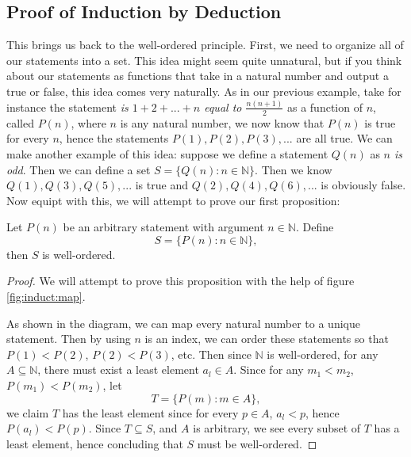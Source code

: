 \documentclass[11pt]{article}
\numberwithin{lemma}{section}
\numberwithin{equation}{section}
\numberwithin{define}{section}
\numberwithin{prop}{section}
\numberwithin{figure}{section}
\numberwithin{theorem}{section}
\newcounter{ex}[section]
\numberwithin{ex}{section}
\def\nat{\mathbb{N}}
\begin{document}
\subsection{Proof of Induction by Deduction}
This brings us back to the well-ordered principle. First, we need to organize all of our statements into a set. This idea might seem quite unnatural, but if you think about our statements as functions that take in a natural number and output a true or false, this idea comes very naturally. 
As in our previous example, take for instance the statement \textit{is $1+2+...+n$ equal to $\frac{n(n+1)}{2}$} as a function of $n$, called $P(n)$, where $n$ is any natural number, we now know that $P(n)$ is true for every $n$, hence the statements $P(1),P(2),P(3),...$ are all true. 
We can make another example of this idea: suppose we define a statement $Q(n)$ as \textit{$n$ is odd}. Then we can define a set $S=\{Q(n):n\in\nat\}$. Then we know $Q(1),Q(3),Q(5),...$ is true and $Q(2),Q(4),Q(6),...$ is obviously false. Now equipt with this, we will attempt to prove our first proposition:
\begin{prop}
\label{prop:well-order}
	Let $P(n)$ be an arbitrary statement with argument $n\in\nat$. Define
	$$S=\{P(n):n\in\nat\},$$
	then $S$ is well-ordered.
\end{prop}
\begin{proof}
	We will attempt to prove this proposition with the help of figure \eqref{fig:induct:map}.
	\begin{figure}[h]
	\centering
		\caption{}
		\label{fig:induct:map}
	\end{figure}
	As shown in the diagram, we can map every natural number to a unique statement. Then by using $n$ is an index, we can order these statements so that $P(1)<P(2)$, $P(2)<P(3)$, etc. Then since $\nat$ is well-ordered, for any $A\subseteq \nat$, there must exist a least element $a_l\in A$. Since for any $m_1<m_2$, $P(m_1)<P(m_2)$, let 
	$$T=\{P(m):m\in A\},$$
	we claim $T$ has the least element since for every $p\in A$, $a_l<p$, hence $P(a_l)<P(p)$. Since $T\subseteq S$, and $A$ is arbitrary, we see every subset of $T$ has a least element, hence concluding that $S$ must be well-ordered. 
\end{proof}
\end{document}
